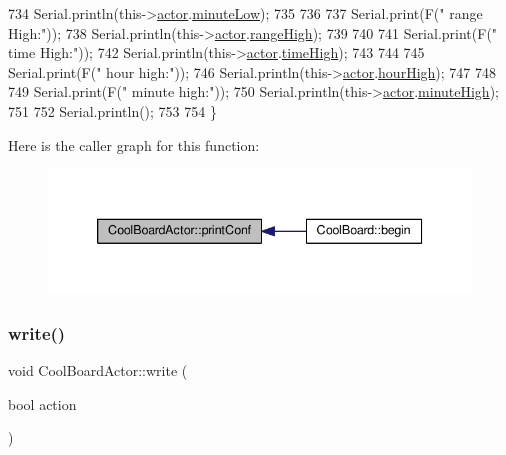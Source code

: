 \begin{DoxyCode}
734     Serial.println(this->\hyperlink{class_cool_board_actor_a8f190db9f7a39fddbcef7f152da970e9}{actor}.\hyperlink{struct_cool_board_actor_1_1state_acbcc2902331fd9d757cd475eb403bdd9}{minuteLow});
735 
736 
737     Serial.print(F(\textcolor{stringliteral}{" range High:"}));
738     Serial.println(this->\hyperlink{class_cool_board_actor_a8f190db9f7a39fddbcef7f152da970e9}{actor}.\hyperlink{struct_cool_board_actor_1_1state_a6e5cd6c5cd44e2decfd8d4df1853f8e3}{rangeHigh});
739 
740 
741     Serial.print(F(\textcolor{stringliteral}{" time High:"}));
742     Serial.println(this->\hyperlink{class_cool_board_actor_a8f190db9f7a39fddbcef7f152da970e9}{actor}.\hyperlink{struct_cool_board_actor_1_1state_a54cd4976b56aeaa6274fe0576aaebb0f}{timeHigh});
743 
744 
745     Serial.print(F(\textcolor{stringliteral}{" hour high:"}));
746     Serial.println(this->\hyperlink{class_cool_board_actor_a8f190db9f7a39fddbcef7f152da970e9}{actor}.\hyperlink{struct_cool_board_actor_1_1state_acd1af3ac2382258a5b05497d814adc01}{hourHigh});
747 
748 
749     Serial.print(F(\textcolor{stringliteral}{" minute high:"}));
750     Serial.println(this->\hyperlink{class_cool_board_actor_a8f190db9f7a39fddbcef7f152da970e9}{actor}.\hyperlink{struct_cool_board_actor_1_1state_a4bff3d61ead74adb60be224764b93006}{minuteHigh});
751 
752     Serial.println(); 
753 
754 \}
\end{DoxyCode}
Here is the caller graph for this function\+:
\nopagebreak
\begin{figure}[H]
\begin{center}
\leavevmode
\includegraphics[width=339pt]{dc/d69/class_cool_board_actor_aabb10e7aebc3249ffc940530de29f84a_icgraph}
\end{center}
\end{figure}
\mbox{\label{class_cool_board_actor_a958786ff01ea1056ee72c72d439f86da}} 
\subsubsection{\texorpdfstring{write()}{write()}}
{\footnotesize\ttfamily void Cool\+Board\+Actor\+::write (\begin{DoxyParamCaption}\item[{bool}]{action }\end{DoxyParamCaption})}

